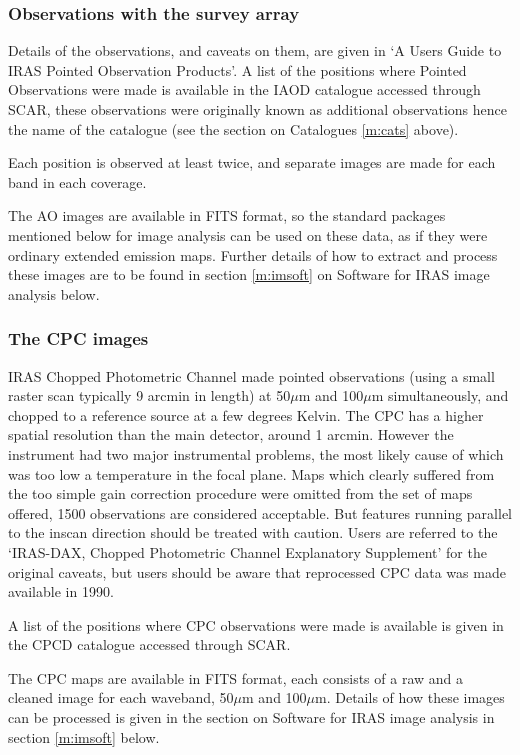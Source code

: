 \subsubsection{Observations with the survey array}
Details of the observations, and caveats on them, are given in `A Users Guide to
IRAS Pointed Observation Products'.
A list of the positions where Pointed Observations were made is available
in the IAOD catalogue accessed through SCAR, these observations were originally
known as additional observations hence the name of the catalogue (see the
section on Catalogues \ref{m:cats} above).

Each position is observed at least twice, and separate images are made for each
band in each coverage.

The AO images are available in FITS format, so the standard packages mentioned
below for image analysis can be used on these data, as if they were ordinary
extended emission maps. Further details of how to extract and process these
images are to be found in section \ref{m:imsoft} on Software for IRAS image
analysis below.

\subsubsection{The CPC images}
IRAS Chopped Photometric Channel made pointed observations (using a small
raster scan typically 9 arcmin in length) at 50$\mu$m and 100$\mu$m
simultaneously, and chopped to a reference source at a few degrees Kelvin. The
CPC has a higher spatial resolution than the main detector, around 1 arcmin.
However
the instrument had two major instrumental problems, the most likely cause of
which was too low a temperature in the focal plane. Maps which clearly suffered
from the too simple gain correction procedure were omitted from the set of
maps offered, 1500 observations are considered acceptable. But features running
parallel to the inscan direction should be treated with caution. Users are
referred to the `IRAS-DAX, Chopped Photometric Channel Explanatory Supplement'
for the original caveats, but users should be aware that reprocessed CPC data
was made available in 1990.

A list of the positions where CPC observations were made is available is given
in the CPCD catalogue accessed through SCAR.

The CPC maps are available in FITS format, each consists of a raw and a cleaned
image for each waveband, 50$\mu$m and 100$\mu$m. Details of how these images can
be processed is given in the section on Software for IRAS image analysis in
section \ref{m:imsoft} below.

